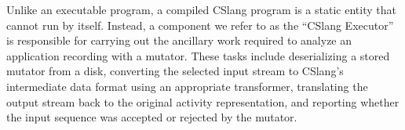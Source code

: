 Unlike an executable program, a compiled CSlang program is a static entity
that cannot run by itself.  Instead, a component we refer to as the
``CSlang Executor'' is responsible for carrying out the ancillary work
required to analyze an application recording with a mutator.
These tasks include deserializing a stored mutator from a disk,
converting the selected input stream
to CSlang's intermediate data format
using an appropriate transformer,
translating the output stream back to the original activity representation,
and reporting whether the input sequence was
accepted or rejected by the mutator.
